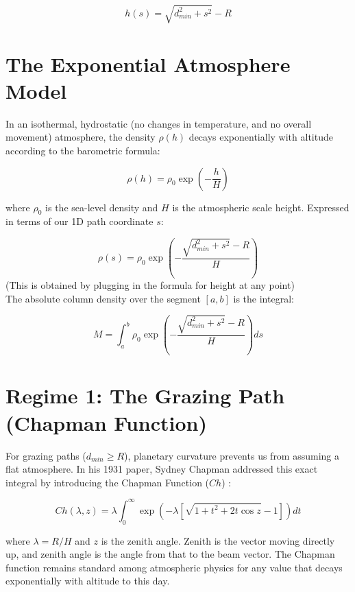 ﻿\documentclass[12pt,a4paper]{article}
\begin{document}
\begin{equation}
h(s) = \sqrt{d_{min}^2 + s^2} - R
\end{equation}

\section{The Exponential Atmosphere Model}
In an isothermal, hydrostatic (no changes in temperature, and no overall movement) atmosphere, the density $\rho(h)$ decays exponentially with altitude according to the barometric formula:

\begin{equation}
\rho(h) = \rho_0 \exp\left(-\frac{h}{H}\right)
\end{equation}

where $\rho_0$ is the sea-level density and $H$ is the atmospheric scale height. Expressed in terms of our 1D path coordinate $s$:

\begin{equation}
\rho(s) = \rho_0 \exp\left( -\frac{\sqrt{d_{min}^2 + s^2} - R}{H} \right)
\end{equation}
(This is obtained by plugging in the formula for height at any point) \\
The absolute column density over the segment $[a, b]$ is the integral:

\begin{equation}
M = \int_{a}^{b} \rho_0 \exp\left( -\frac{\sqrt{d_{min}^2 + s^2} - R}{H} \right) ds
\end{equation}

\section{Regime 1: The Grazing Path (Chapman Function)}
For grazing paths ($d_{min} \ge R$), planetary curvature prevents us from assuming a flat atmosphere. In his 1931 paper, Sydney Chapman addressed this exact integral by introducing the Chapman Function ($Ch$) \cite{chapman1931}:

\begin{equation}
Ch(\lambda, z) = \lambda \int_{0}^{\infty} \exp\left( -\lambda \left[ \sqrt{1 + t^2 + 2t\cos z} - 1 \right] \right) dt
\end{equation}

where $\lambda = R/H$ and $z$ is the zenith angle. Zenith is the vector moving directly up, and zenith angle is the angle from that to the beam vector. The Chapman function remains standard among atmospheric physics for any value that decays exponentially with altitude to this day.
\end{document}

